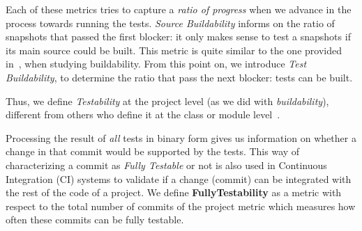 Each of these metrics tries to capture a \textit{ratio of progress} when we advance in the process towards running the tests. \textit{Source Buildability} informs on the ratio of snapshots that passed the first blocker: it only makes sense to test a snapshots if its main source could be built. This metric is quite similar to the one provided in~\cite{tufano2017there}, when studying buildability. From this point on, we introduce \textit{Test Buildability}, to determine the ratio that pass the next blocker: tests can be built.

Thus, we define \textit{Testability} at the project level (as we did with \textit{buildability}), different from others who define it at the class or module level~\cite{bruntink2006empirical}.

Processing the result of \textit{all} tests in binary form gives us information on whether a change in that commit would be supported by the tests. 
This way of characterizing a commit as \textit{Fully Testable} or not is also used in Continuous Integration (CI) systems to validate if a change (commit) can be integrated with the rest of the code of a project.
We define \textbf{FullyTestability} as a metric with respect to the total number of commits of the project metric which measures how often these commits can be fully testable.

